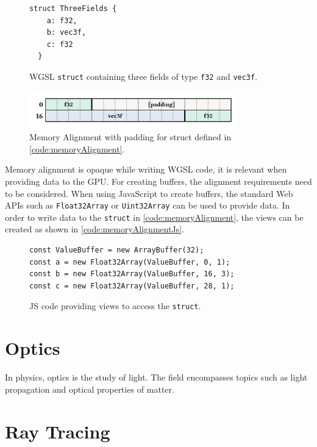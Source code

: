 \begin{figure}[H]
  \begin{lstlisting}[style=wgsl]
  struct ThreeFields {
    a: f32,
    b: vec3f,
    c: f32
  }
  \end{lstlisting}
  \caption{WGSL \texttt{struct} containing three fields of type \texttt{f32} and \texttt{vec3f}.}
  \label{code:memoryAlignment}
  \end{figure}

\begin{figure}[H]
  \centering
  \includegraphics[width=0.8\textwidth]{resources/memory-alignment.png}
  \caption{Memory Alignment with padding for struct defined in \autoref{code:memoryAlignment}.}
  \label{fig:memory-alignment}
\end{figure}

Memory alignment is opaque while writing WGSL code, it is relevant when providing data to the GPU. For creating buffers, the alignment requirements need to be considered. When using JavaScript to create buffers, the standard Web APIs such as \texttt{Float32Array} or \texttt{Uint32Array} can be used to provide data. In order to write data to the \texttt{struct} in \autoref{code:memoryAlignment}, the views can be created as shown in \autoref{code:memoryAlignmentJs}.

\begin{figure}[H]
  \begin{lstlisting}[style=JavaScript]
const ValueBuffer = new ArrayBuffer(32);
const a = new Float32Array(ValueBuffer, 0, 1);
const b = new Float32Array(ValueBuffer, 16, 3);
const c = new Float32Array(ValueBuffer, 28, 1);
  \end{lstlisting}
  \caption{JS code providing views to access the \texttt{struct}.}
  \label{code:memoryAlignmentJs}
\end{figure}

\section{Optics}

In physics, optics is the study of light. The field encompasses topics such as light propagation and optical properties of matter. \cite{fowles1989introduction}

\section{Ray Tracing}
